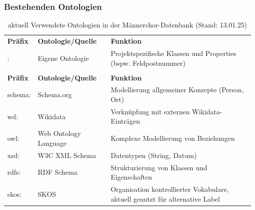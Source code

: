 \documentclass[12pt, a4paper, ngerman, bidi=default]{article}
\begin{document}
\begin{spacing}{1.5}
\begin{figure}[htbp]
\centering

\end{figure}
\newpage
\subsubsection{Bestehenden Ontologien}
\label{tab:bestehenden Ontologien}
\begin{table}[h]
\centering
\renewcommand{\arraystretch}{1.3}  %
\begin{tabular}{@{}>{\ttfamily}l>{\raggedright\arraybackslash}p{5cm}>{\raggedright\arraybackslash}p{7cm}@{}}
\toprule
\rowcolor{gray!20} \multicolumn{3}{c}{\textbf{Interne Ontologien}} \\
\midrule
\textbf{Präfix} & \textbf{Ontologie/Quelle} & \textbf{Funktion} \\
\arrayrulecolor{lightgray}\midrule
: & Eigene Ontologie & Projektspezifische Klassen und Properties (bspw. Feldpostnummer)\\
\arrayrulecolor{black}\midrule
\rowcolor{gray!20} \multicolumn{3}{c}{\textbf{Externe Ontologien}} \\
\midrule
\textbf{Präfix} & \textbf{Ontologie/Quelle} & \textbf{Funktion} \\
\arrayrulecolor{lightgray}\midrule
schema: & Schema.org & Modellierung allgemeiner Konzepte (Person, Ort) \\
wd: & Wikidata & Verknüpfung mit externen Wikidata-Einträgen \\
owl: & Web Ontology Language & Komplexe Modellierung von Beziehungen \\
xsd: & W3C XML Schema & Datentypen (String, Datum) \\
rdfs: & RDF Schema & Strukturierung von Klassen und Eigenschaften \\
skos: & SKOS & Organisation kontrollierter Vokabulare, aktuell genutzt für alternative Label \\
\bottomrule
\end{tabular}
\caption{aktuell Verwendete Ontologien in der Männerchor-Datenbank (Stand: 13.01.25)}
\end{table}
\end{spacing}
\printbibliography
\end{document}
